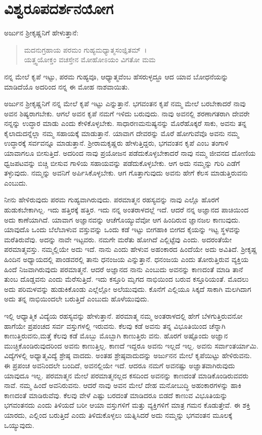 
\chapter{ವಿಶ್ವರೂಪದರ್ಶನಯೋಗ}

ಅರ್ಜುನ ಶ‍್ರೀಕೃಷ್ಣನಿಗೆ ಹೇಳುತ್ತಾನೆ:

\begin{verse}
ಮದನುಗ್ರಹಾಯ ಪರಮಂ ಗುಹ್ಯಮಧ್ಯಾತ್ಮಸಂಜ್ಞಿತಮ್~।\\ಯತ್ತ್ವಯೋಕ್ತಂ ವಚಸ್ತೇನ ಮೋಹೋಽಯಂ ವಿಗತೋ ಮಮ 
\end{verse}

{\small ನನ್ನ ಮೇಲೆ ಕೃಪೆ ಇಟ್ಟು, ಪರಮ ಗುಹ್ಯವೂ, ಆಧ್ಯಾತ್ಮವೆಂಬ ಹೆಸರುಳ್ಳದ್ದೂ ಆದ ಯಾವ ಬೋಧನೆಯನ್ನು ಮಾಡಿದೆಯೊ ಅದರಿಂದ ನನ್ನ ಈ ಮೋಹ ನಾಶವಾಯಿತು.}

ಅರ್ಜುನ ಶ‍್ರೀಕೃಷ್ಣನಿಗೆ ನನ್ನ ಮೇಲೆ ಕೃಪೆ ಇಟ್ಟು ಎನ್ನುತ್ತಾನೆ. ಭಗವಂತನ ಕೃಪೆ ನಮ್ಮ ಮೇಲೆ ಬರಬೇಕಾದರೆ ನಾವು ಅವನ ಶಿಷ್ಯರಾಗಬೇಕು. ಆಗಲೆ ಅವನ ಕೃಪೆ ನಮಗೆ ಇಳಿದು ಬರುವುದು. ನಾವು ಅವನಲ್ಲಿ ಶರಣಾಗತರಾಗಿ ದೇವರೇ ನನ್ನನ್ನು ಉದ್ಧಾರ ಮಾಡು ಎಂದು ಕೇಳಿಕೊಳ್ಳಬೇಕು. ಸಾಧಾರಣಮನುಷ್ಯನನ್ನು ಮೊರೆಹೊಕ್ಕರೆ ಸಾಕು, ಅವನು ತನ್ನ ಕೈಲಾದುದನ್ನೆಲ್ಲಾ ನಮ್ಮ ಸಹಾಯಕ್ಕೆ ಮಾಡುತ್ತಾನೆ. ಯಾವಾಗ ದೇವರನ್ನು ಮೊರೆ ಹೋಗುವೆವೊ ಅವನು ನಮ್ಮ ಉದ್ಧಾರಕ್ಕೆ ಸರ್ವವನ್ನೂ ಮಾಡುತ್ತಾನೆ. ಶ‍್ರೀರಾಮಕೃಷ್ಣರು ಹೇಳುತ್ತಿದ್ದರು, ಭಗವಂತನ ಕೃಪೆ ಎಂಬ ತಂಗಾಳಿ ಯಾವಾಗಲೂ ಬೀಸುತ್ತಿದೆ. ಅದರಿಂದ ನಾವು ಪ್ರಯೋಜನ ಪಡೆದುಕೊಳ್ಳಬೇಕಾದರೆ ನಾವು ನಮ್ಮ ಜೀವನದ ದೋಣಿಯ ಧ್ವಜಪಟವನ್ನು ಬಿಚ್ಚಿ ಬೀಸುವ ಗಾಳಿಯ ಸಹಾಯವನ್ನು ಪಡೆದುಕೊಳ್ಳಬೇಕು. ಆಗ ಅದು ನಮ್ಮನ್ನು ಗುರಿ ಎಡೆಗೆ ತಳ್ಳುವುದು. ನಮ್ಮನ್ನು ಅವನಿಗೆ ಅರ್ಪಿಸಿಕೊಳ್ಳಬೇಕು. ಆಗ ಗೊತ್ತಾಗುವುದು ಅವನು ಹೇಗೆ ಕೆಲಸ ಮಾಡುತ್ತಿರುವನು ಎಂಬುದು.

ನೀನು ಹೇಳಿರುವುದು ಪರಮ ಗುಹ್ಯವಾಗಿರುವುದು. ಪರಮಾತ್ಮನ ರಹಸ್ಯವನ್ನು ನಾವು ಎಲ್ಲೊ ಹೊರಗೆ ಹುಡುಕಬೇಕಾಗಿಲ್ಲ. ಇದು ಹತ್ತಿರಕ್ಕೆ ಹತ್ತಿರ. ಇದು ನನ್ನ ಅಂತರಾಳದಲ್ಲೆ ಇದೆ. ಆದರೆ ನನ್ನ ಅಜ್ಞಾನದ ಪಾಚಿಯಿಂದ ಅದು ಕಾಣೆಯಾಗಿದೆ. ಯಾವಾಗ ಅಜ್ಞಾನವನ್ನು ಆಚೆಗೊಯ್ಯುವೆವೋ ಆಗ ಹಿಂದಿರುವ ಜ್ಞಾನಜಲ ಕಾಣುವುದು. ಯಾವುದೊ ಒಂದು ಬೆಲೆಬಾಳುವ ವಸ್ತುವನ್ನು ಒಂದು ಕಡೆ ಇಟ್ಟು ಬೀಗಹಾಕಿ ಬೀಗದ ಕೈಯನ್ನು ಇಟ್ಟ ಸ್ಥಳವನ್ನು ಮರೆತಿರುವೆವು. ಅದನ್ನು ನಾವೇ ಇಟ್ಟವರು. ನಮಗೇ ಮರೆತು ಹೋಗಿದೆ ಎಲ್ಲಿಟ್ಟೆವು ಎಂದು. ಅದರಂತೆಯೇ ಪರಮಾತ್ಮವಸ್ತು. ನಮ್ಮಲ್ಲಿಯೇ ಅದು ಇದೆ. ನಾನು ಎಂದು ಹೇಳುವ ಅಹಂಕಾರದ ಹಿಂದೆಯೇ ಅದು ಅವಿತಿದೆ. ಶ‍್ರೀಕೃಷ್ಣ ಹಿಂದಿನ ಅಧ್ಯಾಯದಲ್ಲಿ ಪಾಂಡವರಲ್ಲಿ ತಾನು ಧನಂಜಯ ಎನ್ನುತ್ತಾನೆ. ಧನಂಜಯ ಎಂದು ತೋರುತ್ತಿರುವ ವ್ಯಕ್ತಿಯ ಹಿಂದೆ ನಿಜವಾಗಿರುವುದು ಪರಮಾತ್ಮನೆ. ಆದರೆ ಅಜ್ಞಾನದ ನಾನು ಎಂಬುದು ಅವನನ್ನು ಕಾಣದಂತೆ ಮಾಡಿ ತಾನೆ ತುಂಬ ದೊಡ್ಡವನು ಎಂದು ಮೆರೆಸುತ್ತಿದೆ. ಇದು ಕಸ್ತೂರಿ ಮೃಗದ ನಾಭಿಯಿಂದ ಬರುವ ಕಸ್ತೂರಿಯಂತೆ. ಮೊದಲು ಅದು ಪರಿಮಳವನ್ನು ಹುಡುಕಿಕೊಂಡು ಎಲ್ಲೆಲ್ಲೋ ಅಲೆಯುವುದು. ಕೊನೆಗೆ ಎಲ್ಲಿಯೂ ಸಿಕ್ಕದೆ ಸಾಕಾಗಿ ಮಲಗಿದಾಗ ಅದು ತನ್ನ ನಾಭಿಯಿಂದಲೇ ಬರುತ್ತಿದೆ ಎಂಬುದು ಹೊಳೆಯುವುದು.

ಇಲ್ಲಿ ಆಧ್ಯಾತ್ಮಿಕ ವಿದ್ಯೆಯ ರಹಸ್ಯವನ್ನು ಹೇಳುತ್ತಾನೆ. ಪರಮಾತ್ಮ ನಮ್ಮ ಅಂತರಾಳದಲ್ಲಿ ಹೇಗೆ ಬೆಳಗುತ್ತಿರುವನೋ ಹಾಗೆಯೇ ಪ್ರಪಂಚದ ಸರ್ವ ವಸ್ತುಗಳಲ್ಲಿ ಇರುವನು. ಕೆಲವು ಕಡೆ ಅವನು ತನ್ನ ವಿಭೂತಿಯಿಂದ ಚೆನ್ನಾಗಿ ಕಾಣುತ್ತಿರುವನು,ಮತ್ತೆ ಕೆಲವು ಕಡೆ ಮೊಬ್ಬು ಮೊಬ್ಬಾಗಿ ಕಾಣುತ್ತಿರು ವನು. ಹೊರಗೆ ಅಷ್ಟೊಂದು ಅಜ್ಞಾನ ಮುಚ್ಚಿಕೊಂಡಿರುವುದರಿಂದ ಅವನು ಕಾಣುತ್ತಿಲ್ಲ. ಕಾಣದೆ ಇದ್ದರೂ ಅವನು ಇಲ್ಲದೆ ಇಲ್ಲ. ಅವನು ಸರ್ವಾಂತರ್ಯಾಮಿ. ವಿದ್ಯೆಗಳಲ್ಲಿ ಅಧ್ಯಾತ್ಮವಿದ್ಯೆ ಶ್ರೇಷ್ಠ ವಾದದು. ಅಂತಹ ಶ್ರೇಷ್ಠವಾದುದನ್ನು ಅರ್ಜುನನ ಮೇಲೆ ಕೃಪೆಯಿಟ್ಟು ಹೇಳಿರುವನು. ಈ ಪ್ರಪಂಚ ಅವನಿಂದಲೇ ಬಂದಿದೆ, ಅವನಲ್ಲಿಯೇ ಇದೆ. ಆದರೂ ನಮಗೆ ಅವನಷ್ಟು ಅಜ್ಞಾತವಾಗಿರುವುದು ಯಾವುದೂ ಇಲ್ಲ. ಪರಮಾತ್ಮನ ಮೇಲೆ ಪರಮಾತ್ಮನಲ್ಲದ ಕಸದಿಂದ ಅವನನ್ನು ಕಾಣದಂತೆ ಮಾಡಿಕೊಂಡಿರುವವರು ನಾವೆ. ನಮ್ಮ ಹಿಂದೆ ಅವನಿರುವನು. ಆದರೆ ನಾವು ಅವನ ಮೇಲೆ ದೇಹ ಮನೋಬುದ್ಧಿ ಅಹಂಕಾರಗಳನ್ನು ಹಾಕಿ ಕಾಣದಂತೆ ಮಾಡಿರುವೆವು. ಕೆಲವು ವೇಳೆ ಎಷ್ಟು ಬರದಂತೆ ಮಾಡಿದರೂ ಬಿಡದೆ ಕಾಣುವ ವಿಭೂತಿಯನ್ನು ಭಗವಂತನದು ಎಂದು ತಿಳಿಯದೆ ಬರೀ ಆಯಾ ವಸ್ತುಗಳಿಗೆ ಮತ್ತು ವ್ಯಕ್ತಿಗಳಿಗೆ ಮಾತ್ರ ಗಮನ ಕೊಡುತ್ತೇವೆ. ಈ ಶಕ್ತಿ ಯಾರದು, ಎಲ್ಲಿಂದ ಬರುತ್ತಿದೆ ಎಂದು ತಿಳಿದುಕೊಳ್ಳಲು ಯತ್ನಿಸಿದರೆ ಅದು ನಮ್ಮನ್ನು ಭಗವಂತನ ಮೂಲಕ್ಕೆ ಒಯ್ಯುವುದು.

